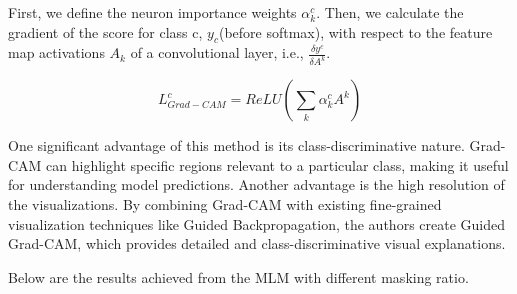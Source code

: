 First, we define the neuron importance weights $\alpha^c_k$. Then, we calculate the gradient of the score for class c, $y_c$(before softmax), with respect to the feature map activations $A_k$ of a convolutional layer, i.e., $\frac{\delta y^c}{\delta A^k}$. 
 
\begin{displaymath}
    L^c_{Grad-CAM} = ReLU(\sum_k\alpha^c_kA^k)
\end{displaymath}

One significant advantage of this method is its class-discriminative nature. Grad-CAM can highlight specific regions relevant to a particular class, making it useful for understanding model predictions. Another advantage is the high resolution of the visualizations. By combining Grad-CAM with existing fine-grained visualization techniques like Guided Backpropagation, the authors create Guided Grad-CAM, which provides detailed and class-discriminative visual explanations.


Below are the results achieved from the MLM with different masking ratio.




